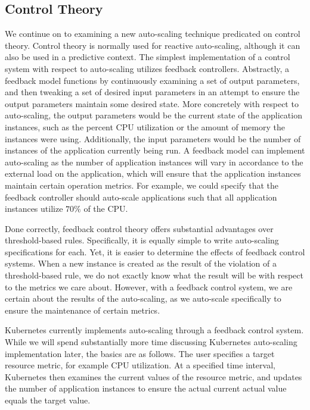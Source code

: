 \documentclass[twoside]{report}
\begin{document}
\subsection{Control Theory}

We continue on to examining a new auto-scaling technique predicated on control
theory. Control theory is normally used for reactive auto-scaling, although it
can also be used in a predictive context. The simplest implementation of a
control system with respect to auto-scaling utilizes feedback
controllers.\cite[pg.
25]{auto-scaling-techniques-for-elastic-applications-in-cloud-environments}
Abstractly, a feedback model functions by continuously examining a set of output parameters,
and then tweaking a set of desired input parameters in an attempt to ensure the
output parameters maintain some desired state. More concretely with respect to
auto-scaling, the output parameters would be the current state of the
application instances, such as the percent CPU utilization or the amount of
memory the instances were using. Additionally, the input parameters would be the
number of instances of the application currently being run. A feedback model
can implement auto-scaling as the number of application instances will vary in
accordance to the external load on the application, which will ensure that the
application instances maintain certain operation metrics. For example, we could
specify that the feedback controller should auto-scale applications such that
all application instances utilize $70\%$ of the CPU.

Done correctly, feedback control theory offers substantial advantages over
threshold-based rules. Specifically, it is equally simple to write auto-scaling
specifications for each. Yet, it is easier to determine the effects of feedback
control systems. When a new instance is created as the result of the violation
of a threshold-based rule, we do not exactly know what the result will be with
respect to the metrics we care about. However, with a feedback control system,
we are certain about the results of the auto-scaling, as we auto-scale
specifically to ensure the maintenance of certain metrics.

Kubernetes currently implements auto-scaling through a feedback control system.
While we will spend substantially more time discussing Kubernetes auto-scaling
implementation later, the basics are as follows. The user specifies a target resource
metric, for example CPU utilization. At a specified time interval,
Kubernetes then examines the current values
of the resource metric, and updates the number of application instances to
ensure the actual current actual value equals the target
value.\cite{k8s-horizontal-pod-autoscaler-proposal}
\end{document}
